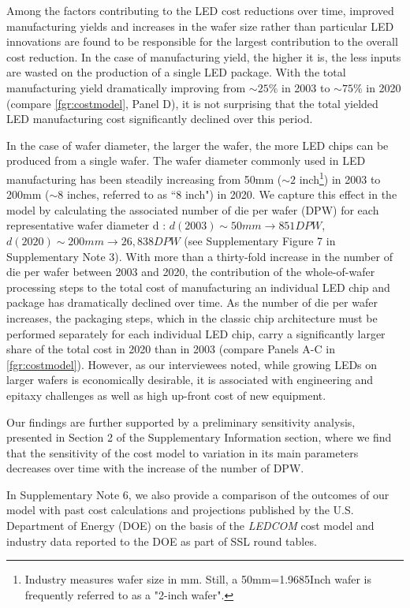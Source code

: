 \documentclass[parskip=full]{article}
\begin{document}
Among the factors contributing to the LED cost reductions over time, improved manufacturing yields and increases in the wafer size rather than particular LED innovations are found to be responsible for the largest contribution to the overall cost reduction. In the case of manufacturing yield, the higher it is, the less inputs are wasted on the production of a single LED package. With the total manufacturing yield dramatically improving from $\sim25\%$ in 2003 to $\sim75\%$ in 2020 (compare \cref{fgr:costmodel}, Panel D), it is not surprising that the total yielded LED manufacturing cost significantly declined over this period.

In the case of wafer diameter, the larger the wafer, the more LED chips can be produced from a single wafer. The wafer diameter commonly used in LED manufacturing has been steadily increasing from 50mm ($\sim2$ inch\footnote{Industry measures wafer size in mm. Still, a 50mm=1.9685Inch wafer is frequently referred to as a "2-inch wafer".}) in 2003 to 200mm ($\sim$8 inches, referred to as “8 inch") in 2020. We capture this effect in the model by calculating the associated number of die per wafer (DPW) for each representative wafer diameter d \cite{de2005investigation}: $d(2003)\sim 50 mm \rightarrow851 DPW$, $d(2020)\sim200 mm \rightarrow 26,838 DPW$ (see Supplementary Figure 7 in Supplementary Note 3). With more than a thirty-fold increase in the number of die per wafer between 2003 and 2020, the contribution of the whole-of-wafer processing steps to the total cost of manufacturing an individual LED chip and package has dramatically declined over time. As the number of die per wafer increases, the packaging steps, which in the classic chip architecture must be performed separately for each individual LED chip, carry a significantly larger share of the total cost in 2020 than in 2003 (compare Panels A-C in \cref{fgr:costmodel}). However, as our interviewees noted, while growing LEDs on larger wafers is economically desirable, it is associated with engineering and epitaxy challenges as well as high up-front cost of new equipment.

Our findings are further supported by a preliminary sensitivity analysis, presented in Section 2 of the Supplementary Information section, where we find that the sensitivity of the cost model to variation in its main parameters decreases over time with the increase of the number of DPW. 

In Supplementary Note 6, we also provide a comparison of the outcomes of our model with past cost calculations and projections published by the U.S. Department of Energy (DOE) on the basis of the \textit{LEDCOM} cost model \cite{ledcomv2} and industry data reported to the DOE as part of SSL round tables.
\end{document}
